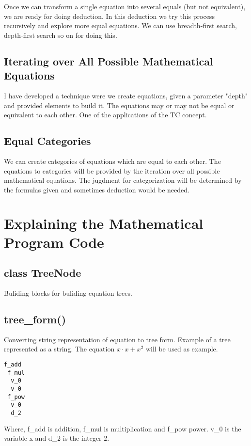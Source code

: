 \documentclass{book}
\begin{document}
Once we can transform a single equation into several equals (but not equivalent), we are ready for doing deduction. In this deduction we try this process recursively and explore more equal equations. We can use breadth-first search, depth-first search so on for doing this.

\section{Iterating over All Possible Mathematical Equations}

I have developed a technique were we create equations, given a parameter "depth" and provided elements to build it. The equations may or may not be equal or equivalent to each other. One of the applications of the TC concept.

\section{Equal Categories}

We can create categories of equations which are equal to each other. The equations to categories will be provided by the iteration over all possible mathematical equations. The jugdment for categorization will be determined by the formulas given and sometimes deduction would be needed.

\chapter{Explaining the Mathematical Program Code}

\section{class TreeNode}

Buliding blocks for buliding equation trees.

\section{tree\_form()}

Converting string representation of equation to tree form. Example of a tree represented as a string. The equation \(x \cdot x + x^2\) will be used as example.
\begin{lstlisting}[caption={Example text file representation}, label={lst:text_file}]
f_add
 f_mul
  v_0
  v_0
 f_pow
  v_0
  d_2
\end{lstlisting}
Where, f\_add is addition, f\_mul is multiplication and f\_pow power. v\_0 is the variable x and d\_2 is the integer 2.
\end{document}
